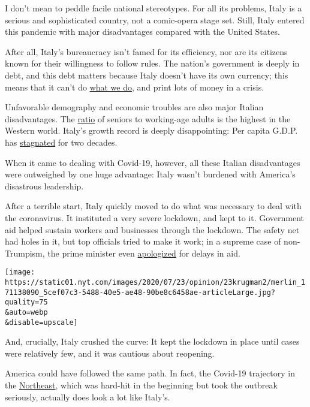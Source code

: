 I don't mean to peddle facile national stereotypes. For all its
problems, Italy is a serious and sophisticated country, not a
comic-opera stage set. Still, Italy entered this pandemic with major
disadvantages compared with the United States.

After all, Italy's bureaucracy isn't famed for its efficiency, nor are
its citizens known for their willingness to follow rules. The nation's
government is deeply in debt, and this debt matters because Italy
doesn't have its own currency; this means that it can't do
\href{https://www.nytimes.com/2020/07/22/opinion/economy-spending-modern-monetary-theory.html}{what
we do}, and print lots of money in a crisis.

Unfavorable demography and economic troubles are also major Italian
disadvantages. The
\href{https://data.oecd.org/pop/elderly-population.htm}{ratio} of
seniors to working-age adults is the highest in the Western world.
Italy's growth record is deeply disappointing: Per capita G.D.P. has
\href{https://fred.stlouisfed.org/series/NYGDPPCAPKDITA}{stagnated} for
two decades.

When it came to dealing with Covid-19, however, all these Italian
disadvantages were outweighed by one huge advantage: Italy wasn't
burdened with America's disastrous leadership.

After a terrible start, Italy quickly moved to do what was necessary to
deal with the coronavirus. It instituted a very severe lockdown, and
kept to it. Government aid helped sustain workers and businesses through
the lockdown. The safety net had holes in it, but top officials tried to
make it work; in a supreme case of non-Trumpism, the prime minister even
\href{https://www.bloomberg.com/news/articles/2020-05-01/europe-s-wary-reopening-begins-with-apology-by-italian-leader?sref=qzusa8bC}{apologized}
for delays in aid.

\texttt{[image: https://static01.nyt.com/images/2020/07/23/opinion/23krugman2/merlin\_171138090\_5cef07c3-5488-40e5-ae48-90be8c6458ae-articleLarge.jpg?quality=75\\\&auto=webp\\\&disable=upscale]}

And, crucially, Italy crushed the curve: It kept the lockdown in place
until cases were relatively few, and it was cautious about reopening.

America could have followed the same path. In fact, the Covid-19
trajectory in the
\href{https://www.nytimes.com/2020/07/23/briefing/home-schooling-coronavirus-portland-your-thursday-briefing.html}{Northeast},
which was hard-hit in the beginning but took the outbreak seriously,
actually does look a lot like Italy's.

